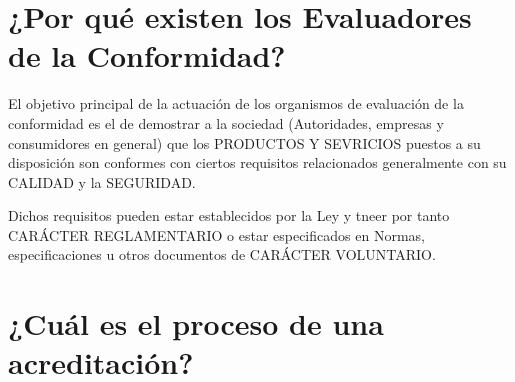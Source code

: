 \section{¿Por qué existen los Evaluadores de la Conformidad?}
El objetivo principal de la actuación de los organismos de evaluación de la conformidad es el de demostrar a la sociedad (Autoridades, empresas y consumidores en general) que los PRODUCTOS Y SEVRICIOS puestos a su disposición son conformes con ciertos requisitos relacionados generalmente con su CALIDAD y la SEGURIDAD.

Dichos requisitos pueden estar establecidos por la Ley y tneer por tanto CARÁCTER REGLAMENTARIO o estar especificados en Normas, especificaciones u otros documentos de CARÁCTER VOLUNTARIO.

\section{¿Cuál es el proceso de una acreditación?}

